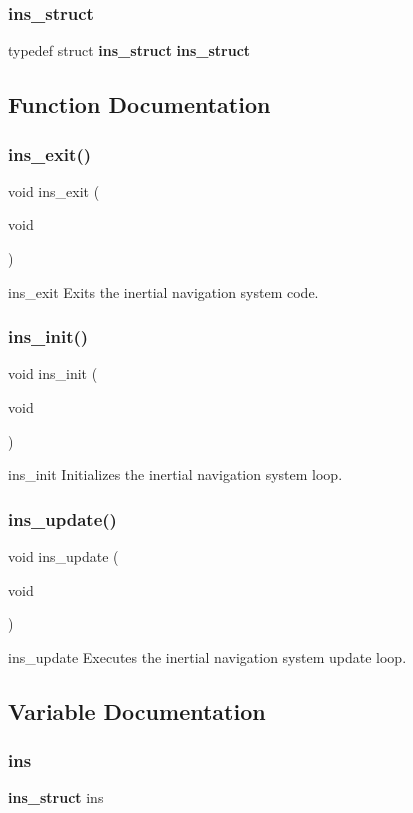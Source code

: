 \subsubsection{ins\+\_\+struct}
{\footnotesize\ttfamily typedef struct \textbf{ ins\+\_\+struct}  \textbf{ ins\+\_\+struct}}



\subsection{Function Documentation}
\mbox{\label{ins_8h_ae333466ed9590c9a9d47a8d2d3fd7d74}} 
\subsubsection{ins\+\_\+exit()}
{\footnotesize\ttfamily void ins\+\_\+exit (\begin{DoxyParamCaption}\item[{void}]{ }\end{DoxyParamCaption})}

ins\+\_\+exit Exits the inertial navigation system code. \mbox{\label{ins_8h_abf3028c2ada542781b8a5e1eb20c17ce}} 
\subsubsection{ins\+\_\+init()}
{\footnotesize\ttfamily void ins\+\_\+init (\begin{DoxyParamCaption}\item[{void}]{ }\end{DoxyParamCaption})}

ins\+\_\+init Initializes the inertial navigation system loop. \mbox{\label{ins_8h_a74e9285079c0cacb835d7dc6a686be18}} 
\subsubsection{ins\+\_\+update()}
{\footnotesize\ttfamily void ins\+\_\+update (\begin{DoxyParamCaption}\item[{void}]{ }\end{DoxyParamCaption})}

ins\+\_\+update Executes the inertial navigation system update loop. 

\subsection{Variable Documentation}
\mbox{\label{ins_8h_aa5d68d9bedfc14b09912de5e41e4d6b3}} 
\subsubsection{ins}
{\footnotesize\ttfamily \textbf{ ins\+\_\+struct} ins}

